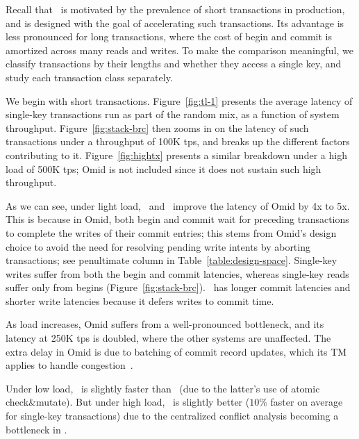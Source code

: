 %
Recall that \sys\ is motivated by the prevalence of short transactions in production, and is designed with
the goal of accelerating such transactions.
Its advantage is less pronounced for long transactions, where the cost of begin and commit is amortized
across many reads and writes.
To make the comparison meaningful, we classify transactions by their lengths and whether they
access a single key, and study each transaction class separately. 

We begin with short transactions. 
Figure~\ref{fig:tl-1} presents the average latency of single-key transactions run as part of the random mix,
as a function of {system} throughput.
Figure~\ref{fig:stack-brc}  then zooms in on the latency of such transactions under 
a throughput of 100K tps, and breaks up the different factors contributing to it. 
Figure~\ref{fig:hightx}  presents a similar breakdown under a high load of 500K tps; Omid 
is not included since it does not sustain such high throughput.

As we can see, under light load, \sysll\ and \syspc\ improve the latency of Omid by 4x to 5x.
This is because in Omid, both begin and commit wait for preceding transactions to complete the writes of 
their commit entries; this stems from Omid's design choice to avoid the need for resolving pending write intents
by aborting transactions; see penultimate column in Table~\ref{table:design-space}. 
Single-key writes suffer from both the begin and commit latencies, whereas single-key reads  
suffer only from begins (Figure~\ref{fig:stack-brc}). \syspc\ has longer commit latencies and shorter write latencies
because it defers writes to commit time.

As load increases, Omid suffers from a well-pronounced bottleneck, and its latency at 250K tps is doubled, where the other systems
are unaffected. The extra delay in Omid is due to batching of commit record updates, 
which its TM applies to handle congestion~\cite{Omid2017}. 

Under low load, \sysll\ is slightly faster than \syspc\ (due to the latter's use of atomic check\&mutate). 
But under high load, \syspc\ is slightly better ($10\%$ faster on average for single-key transactions)   
due to the centralized conflict analysis becoming a bottleneck in \sysll.

